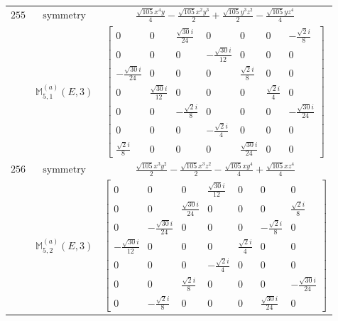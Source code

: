 \documentclass[fleqn,8pt,landscape]{jsarticle}
\begin{document}
\begin{longtable}{ccc}
$ 255 $ & $ \text{symmetry} $ & $ \frac{\sqrt{105} x^{4} y}{4} - \frac{\sqrt{105} x^{2} y^{3}}{2} + \frac{\sqrt{105} y^{3} z^{2}}{2} - \frac{\sqrt{105} y z^{4}}{4} $ \\
$  $ & $ \mathbb{M}_{5,1}^{(a)}(E,3) $ & $ \begin{bmatrix} 0 & 0 & \frac{\sqrt{30} i}{24} & 0 & 0 & 0 & - \frac{\sqrt{2} i}{8} \\ 0 & 0 & 0 & - \frac{\sqrt{30} i}{12} & 0 & 0 & 0 \\ - \frac{\sqrt{30} i}{24} & 0 & 0 & 0 & \frac{\sqrt{2} i}{8} & 0 & 0 \\ 0 & \frac{\sqrt{30} i}{12} & 0 & 0 & 0 & \frac{\sqrt{2} i}{4} & 0 \\ 0 & 0 & - \frac{\sqrt{2} i}{8} & 0 & 0 & 0 & - \frac{\sqrt{30} i}{24} \\ 0 & 0 & 0 & - \frac{\sqrt{2} i}{4} & 0 & 0 & 0 \\ \frac{\sqrt{2} i}{8} & 0 & 0 & 0 & \frac{\sqrt{30} i}{24} & 0 & 0 \end{bmatrix} $ \\ \hline
$ 256 $ & $ \text{symmetry} $ & $ \frac{\sqrt{105} x^{3} y^{2}}{2} - \frac{\sqrt{105} x^{3} z^{2}}{2} - \frac{\sqrt{105} x y^{4}}{4} + \frac{\sqrt{105} x z^{4}}{4} $ \\
$  $ & $ \mathbb{M}_{5,2}^{(a)}(E,3) $ & $ \begin{bmatrix} 0 & 0 & 0 & \frac{\sqrt{30} i}{12} & 0 & 0 & 0 \\ 0 & 0 & \frac{\sqrt{30} i}{24} & 0 & 0 & 0 & \frac{\sqrt{2} i}{8} \\ 0 & - \frac{\sqrt{30} i}{24} & 0 & 0 & 0 & - \frac{\sqrt{2} i}{8} & 0 \\ - \frac{\sqrt{30} i}{12} & 0 & 0 & 0 & \frac{\sqrt{2} i}{4} & 0 & 0 \\ 0 & 0 & 0 & - \frac{\sqrt{2} i}{4} & 0 & 0 & 0 \\ 0 & 0 & \frac{\sqrt{2} i}{8} & 0 & 0 & 0 & - \frac{\sqrt{30} i}{24} \\ 0 & - \frac{\sqrt{2} i}{8} & 0 & 0 & 0 & \frac{\sqrt{30} i}{24} & 0 \end{bmatrix} $ \\ \hline
\end{longtable}
\end{document}
